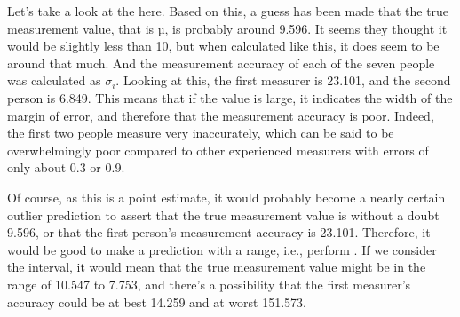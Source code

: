 \documentclass{ltjsbook}
\begin{document}
Let's take a look at the  here.
Based on this, a guess has been made that the true measurement value, that is µ, is probably around 9.596. It seems they thought it would be slightly less than 10, but when calculated like this, it does seem to be around that much.
And the measurement accuracy of each of the seven people was calculated as $\sigma_i$. Looking at this, the first measurer is 23.101, and the second person is 6.849. This means that if the value is large, it indicates the width of the margin of error, and therefore that the measurement accuracy is poor. Indeed, the first two people measure very inaccurately, which can be said to be overwhelmingly poor compared to other experienced measurers with errors of only about 0.3 or 0.9.

Of course, as this is a point estimate, it would probably become a nearly certain outlier prediction to assert that the true measurement value is without a doubt 9.596, or that the first person's measurement accuracy is 23.101. Therefore, it would be good to make a prediction with a range, i.e., perform . If we consider the interval, it would mean that the true measurement value might be in the range of 10.547 to 7.753, and there's a possibility that the first measurer's accuracy could be at best 14.259 and at worst 151.573.
\end{document}
